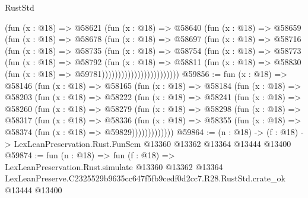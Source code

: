\begin{lexlean}{RustStd}
\begin{coremodule}
                          (fun (x : @18) =>
                          @58621
                            (fun (x : @18) =>
                            @58640
                              (fun (x : @18) =>
                              @58659
                                (fun (x : @18) =>
                                @58678
                                  (fun (x : @18) =>
                                  @58697
                                    (fun (x : @18) =>
                                    @58716
                                      (fun (x : @18) =>
                                      @58735
                                        (fun (x : @18) =>
                                        @58754
                                          (fun (x : @18) =>
                                          @58773
                                            (fun (x : @18) =>
                                            @58792
                                              (fun (x : @18) =>
                                              @58811
                                                (fun (x : @18) =>
                                                @58830
                                                  (fun (x : @18) => @59781))))))))))))))))))))))))
@59856 := fun (x : @18) =>
  @58146
    (fun (x : @18) =>
    @58165
      (fun (x : @18) =>
      @58184
        (fun (x : @18) =>
        @58203
          (fun (x : @18) =>
          @58222
            (fun (x : @18) =>
            @58241
              (fun (x : @18) =>
              @58260
                (fun (x : @18) =>
                @58279
                  (fun (x : @18) =>
                  @58298
                    (fun (x : @18) =>
                    @58317
                      (fun (x : @18) =>
                      @58336
                        (fun (x : @18) =>
                        @58355 (fun (x : @18) => @58374 (fun (x : @18) => @59829)))))))))))))
@59864 := (n : @18) ->
  (f : @18) -> LexLeanPreservation.Rust.FunSem @13360 @13362 @13364 @13444 @13400
@59874 := fun (n : @18) =>
  fun (f : @18) =>
  LexLeanPreservation.Rust.simulate
    @13360
    @13362
    @13364
    LexLeanPreserve.C2325529b9635cc647f5fb9cedf0d2cc7.R28.RustStd.crate_ok
    @13444
    @13400
\end{coremodule}
\end{lexlean}

